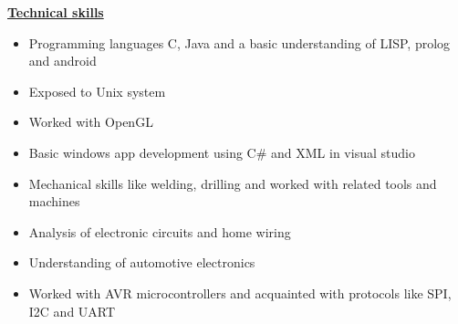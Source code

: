 \documentclass[10pt]{article}
\begin{document}
		\underline{\textbf{\Large{Technical skills}}}
		\begin{itemize}
			\item{Programming languages C, Java and a basic understanding of LISP, prolog and android}
			\item{Exposed to Unix system}
			\item{Worked with OpenGL}					
			\item{Basic windows app development using C\# and XML in visual studio}
			\item{Mechanical skills like welding, drilling and worked with related tools and machines}
			\item{Analysis of electronic circuits and home wiring}
			\item{Understanding of automotive electronics}
			\item{Worked with AVR microcontrollers and acquainted with protocols like SPI, I2C and UART}
		\end{itemize}
		
		\hfill 
		
\end{document}

